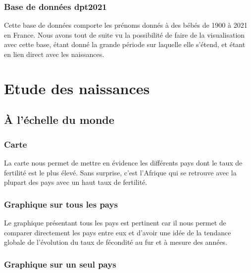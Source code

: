 \documentclass[
]{article}
\begin{document}
\hypertarget{base-de-donnuxe9es-dpt2021}{%
\subsubsection{Base de données
dpt2021}\label{base-de-donnuxe9es-dpt2021}}

Cette base de données comporte les prénoms donnés à des bébés de 1900 à
2021 en France. Nous avons tout de suite vu la possibilité de faire de
la visualisation avec cette base, étant donné la grande période sur
laquelle elle s'étend, et étant en lien direct avec les naissances.

\hypertarget{etude-des-naissances}{%
\section{Etude des naissances}\label{etude-des-naissances}}

\hypertarget{uxe0-luxe9chelle-du-monde}{%
\subsection{À l'échelle du monde}\label{uxe0-luxe9chelle-du-monde}}

\hypertarget{carte}{%
\subsubsection{Carte}\label{carte}}

La carte nous permet de mettre en évidence les différents pays dont le
taux de fertilité est le plus élevé. Sans surprise, c'est l'Afrique qui
se retrouve avec la plupart des pays avec un haut taux de fertilité.

\hypertarget{graphique-sur-tous-les-pays}{%
\subsubsection{Graphique sur tous les
pays}\label{graphique-sur-tous-les-pays}}

Le graphique présentant tous les pays est pertinent car il nous permet
de comparer directement les pays entre eux et d'avoir une idée de la
tendance globale de l'évolution du taux de fécondité au fur et à mesure
des années.

\hypertarget{graphique-sur-un-seul-pays}{%
\subsubsection{Graphique sur un seul
pays}\label{graphique-sur-un-seul-pays}}
\end{document}
